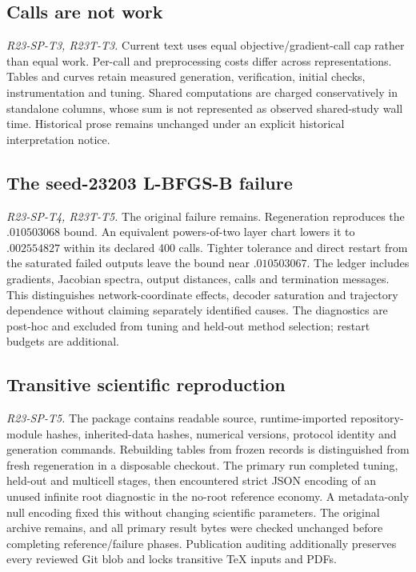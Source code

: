 \subsection{Calls are not work}
\noindent\textit{R23-SP-T3, R23T-T3.}
Current text uses equal objective/gradient-call cap rather than equal work. Per-call and preprocessing costs differ across representations. Tables and curves retain measured generation, verification, initial checks, instrumentation and tuning. Shared computations are charged conservatively in standalone columns, whose sum is not represented as observed shared-study wall time. Historical prose remains unchanged under an explicit historical interpretation notice.

\subsection{The seed-23203 L-BFGS-B failure}
\noindent\textit{R23-SP-T4, R23T-T5.}
The original failure remains. Regeneration reproduces the $.010503068$ bound. An equivalent powers-of-two layer chart lowers it to $.002554827$ within its declared 400 calls. Tighter tolerance and direct restart from the saturated failed outputs leave the bound near $.010503067$. The ledger includes gradients, Jacobian spectra, output distances, calls and termination messages. This distinguishes network-coordinate effects, decoder saturation and trajectory dependence without claiming separately identified causes. The diagnostics are post-hoc and excluded from tuning and held-out method selection; restart budgets are additional.

\subsection{Transitive scientific reproduction}
\noindent\textit{R23-SP-T5.}
The package contains readable source, runtime-imported repository-module hashes, inherited-data hashes, numerical versions, protocol identity and generation commands. Rebuilding tables from frozen records is distinguished from fresh regeneration in a disposable checkout. The primary run completed tuning, held-out and multicell stages, then encountered strict JSON encoding of an unused infinite root diagnostic in the no-root reference economy. A metadata-only null encoding fixed this without changing scientific parameters. The original archive remains, and all primary result bytes were checked unchanged before completing reference/failure phases. Publication auditing additionally preserves every reviewed Git blob and locks transitive TeX inputs and PDFs.

